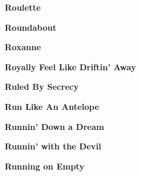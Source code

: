 \newline
\vspace{10pt} 
\begin{center}\textbf{Roulette}\end{center}
\newline
\vspace{10pt} 
\begin{center}\textbf{Roundabout}\end{center}
\newline
\vspace{10pt} 
\begin{center}\textbf{Roxanne}\end{center}
\newline
\vspace{10pt} 
\begin{center}\textbf{Royally Feel Like Driftin' Away}\end{center}
\newline
\vspace{10pt} 
\begin{center}\textbf{Ruled By Secrecy}\end{center}
\newline
\vspace{10pt} 
\begin{center}\textbf{Run Like An Antelope}\end{center}
\newline
\vspace{10pt} 
\begin{center}\textbf{Runnin' Down a Dream}\end{center}
\newline
\vspace{10pt} 
\begin{center}\textbf{Runnin' with the Devil}\end{center}
\newline
\vspace{10pt} 
\begin{center}\textbf{Running on Empty}\end{center}
\newline
